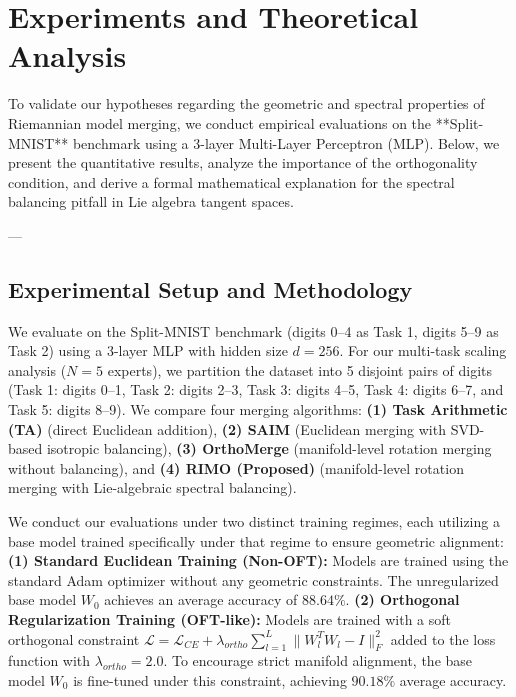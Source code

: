 \section{Experiments and Theoretical Analysis}
\label{sec:experiments}

To validate our hypotheses regarding the geometric and spectral properties of Riemannian model merging, we conduct empirical evaluations on the **Split-MNIST** benchmark using a 3-layer Multi-Layer Perceptron (MLP). Below, we present the quantitative results, analyze the importance of the orthogonality condition, and derive a formal mathematical explanation for the spectral balancing pitfall in Lie algebra tangent spaces.

---

\subsection{Experimental Setup and Methodology}
\label{subsec:setup}
We evaluate on the Split-MNIST benchmark (digits 0--4 as Task 1, digits 5--9 as Task 2) using a 3-layer MLP with hidden size $d = 256$. For our multi-task scaling analysis ($N=5$ experts), we partition the dataset into 5 disjoint pairs of digits (Task 1: digits 0--1, Task 2: digits 2--3, Task 3: digits 4--5, Task 4: digits 6--7, and Task 5: digits 8--9). We compare four merging algorithms: \textbf{(1) Task Arithmetic (TA)} \cite{ilharco2022editing} (direct Euclidean addition), \textbf{(2) SAIM} \cite{saim2026} (Euclidean merging with SVD-based isotropic balancing), \textbf{(3) OrthoMerge} \cite{yang2026orthomerge} (manifold-level rotation merging without balancing), and \textbf{(4) RIMO (Proposed)} (manifold-level rotation merging with Lie-algebraic spectral balancing).

We conduct our evaluations under two distinct training regimes, each utilizing a base model trained specifically under that regime to ensure geometric alignment: \textbf{(1) Standard Euclidean Training (Non-OFT):} Models are trained using the standard Adam optimizer without any geometric constraints. The unregularized base model $W_0$ achieves an average accuracy of $88.64\%$. \textbf{(2) Orthogonal Regularization Training (OFT-like):} Models are trained with a soft orthogonal constraint $\mathcal{L} = \mathcal{L}_{CE} + \lambda_{ortho} \sum_{l=1}^L \|W_l^T W_l - I\|_F^2$ added to the loss function with $\lambda_{ortho} = 2.0$. To encourage strict manifold alignment, the base model $W_0$ is fine-tuned under this constraint, achieving $90.18\%$ average accuracy.

